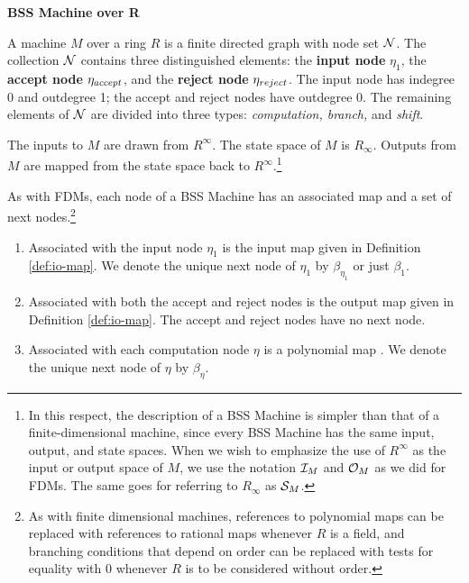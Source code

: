  \begin{definition}{\textbf{BSS Machine over R}}

    A machine $M$ over a ring $R$ is a finite directed graph with
    node set $\mathcal{N}$.  The collection $\mathcal{N}$ contains three
    distinguished elements: the \textbf{input node} $\eta_1$, the
    \textbf{accept node} $\eta_{accept}$, and the \textbf{reject node}
    $\eta_{reject}$.  The input node has indegree 0 and outdegree 1; the
    accept and reject nodes have outdegree 0.  The remaining
    elements of $\mathcal{N}$ are divided into three types:
    \emph{computation, branch,} and \emph{shift}.

    The inputs to $M$ are drawn from $R^\infty$.  The state space of
    $M$ is $R_\infty$.  Outputs from $M$ are mapped from the state
    space back to $R^\infty$.\footnote{In this respect, the
      description of a BSS Machine is simpler than that of a
      finite-dimensional machine, since every BSS Machine has the same
      input, output, and state spaces.  When we wish to emphasize the
      use of $R^\infty$ as the input or output space of $M$, we use
      the notation $\mathcal{I}_M$ and $\mathcal{O}_M$ as we did for FDMs.
      The same goes for referring to $R_\infty$ as $\mathcal{S}_M$.}

    As with FDMs, each node of a BSS Machine has an associated map and
    a set of next nodes.\footnote{As with finite dimensional machines,
      references to polynomial maps can be replaced with references to
      rational maps whenever $R$ is a field, and branching conditions
      that depend on order can be replaced with tests for equality
      with $0$ whenever $R$ is to be considered without order.}

    \begin{enumerate}
    \item Associated with the input node $\eta_1$ is the input map
       given in Definition
      \ref{def:io-map}. We denote the unique next node of $\eta_1$ by
      $\beta_{\eta_1}$ or just $\beta_1$.

    \item Associated with both the accept and reject nodes is the
      output map  given in
      Definition \ref{def:io-map}.  The accept and reject nodes have
      no next node.

    \item Associated with each computation node $\eta$ is a polynomial
      map . We denote
      the unique next node of $\eta$ by $\beta_\eta$.


\end{enumerate}
\end{definition}
